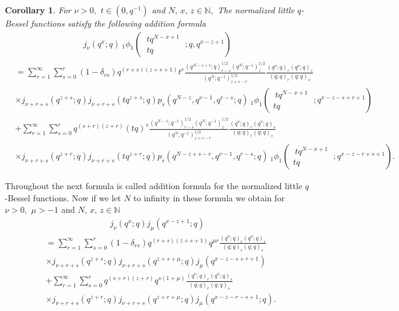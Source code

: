 \documentclass[12pt,a4paper]{amsart}
\numberwithin{equation}{section}
\theoremstyle{plain}
\newtheorem{corollary}[theorem]{Corollary}
\theoremstyle{definition}
\theoremstyle{remark}
\numberwithin{equation}{section}
\numberwithin{table}{section}
\numberwithin{figure}{section}
\begin{document}
\begin{corollary} For $\nu >0,$ $t\in(0,q^{-1})$ and $N,\,x,\,z \in
\mathbb{N},$ The normalized little $q$-Bessel functions satisfy the
following addition formula
\begin{align}
j_{\nu}(q^x;q)\ _{1}\phi_1\left(\begin{matrix} \ tq^{N-x+1}\  \\
\
tq\end{matrix};q,q^{x-z+1}\right)\label{42}
\end{align}
\begin{align*}
&=\sum_{r=1}^{\infty}\sum_{s=0}^{r}(1-\delta_{rs})q^{(r+s)(z+s+1)}t^r
\frac{(q^{N-z+1};q)_{r-s}^{1/2}(q^N;q^{-1})_z^{1/2}}{(q^N;q^{-1})_{z+s-r}^{1/2}}\frac{(q^{\nu};q)_r
(q^{\nu};q)_s}{(q;q)_r (q;q)_s}\\&
 \times
j_{\nu+r+s}(q^{z+s};q)j_{\nu+r+s}(tq^{z+s};q)
p_{s}(q^{N-z},q^{\nu-1},q^{r-s};q)\ _{1}\phi_1\left(\begin{matrix} \
tq^{N-x+1}\   \\
tq\end{matrix};q^{x-z-s+r+1}\right)\\&+\sum_{r=1}^{\infty}\sum_{s=0}^{r}q^{(s+r)(z+r)}(tq)^s
\frac{(q^{N-z};q^{-1})_{r-s}^{1/2}(q^N;q^{-1})_z^{1/2}}{(q^N;q^{-1})_{z+s-r}^{1/2}}\frac{(q^{\nu};q)_r
(q^{\nu};q)_s}{(q;q)_r (q;q)_s}
\\&\times
j_{\nu+r+s}(q^{z+r};q)j_{\nu+r+s}(tq^{z+r};q)p_{s}(q^{N-z+s-r},q^{\nu-1},q^{r-s};q)\
_{1}\phi_1\left(\begin{matrix} \
tq^{N-x+1} \   \\
tq\end{matrix};q^{x-z-r+s+1}\right).
\end{align*}
\end{corollary}
Throughout the next formula is called addition formula for the
normalized little $q$-Bessel functions. Now if we let $N$ to
infinity in these formula we obtain for $\nu >0,$ $\mu >-1$ and
$N,\,x,\,z \in \mathbb{N}$
\begin{align}
j_{\nu}(q^x;q)j_{\mu}(q^{x-z+1};q)
\end{align}
\begin{align*}&
=\sum_{r=1}^{\infty}\sum_{s=0}^{r}(1-\delta_{rs})q^{(r+s)(z+s+1)}q^{\mu
r} \frac{(q^{\nu};q)_r(q^{\nu};q)_s}{(q;q)_r (q;q)_s}\\&
 \times
j_{\nu+r+s}(q^{z+s};q)j_{\nu+r+s}(q^{z+s+\mu};q)j_{\mu}(q^{x-z-s+r+1})
\\&+\sum_{r=1}^{\infty}\sum_{s=0}^{r}q^{(s+r)(z+r)}q^{s(1+\mu)}
\frac{(q^{\nu};q)_r
(q^{\nu};q)_s}{(q;q)_r (q;q)_s}
\\&\times
j_{\nu+r+s}(q^{z+r};q)j_{\nu+r+s}(q^{z+r+\mu};q)
j_{\mu}(q^{x-z-r-s+1};q).
\end{align*}
\end{document}
